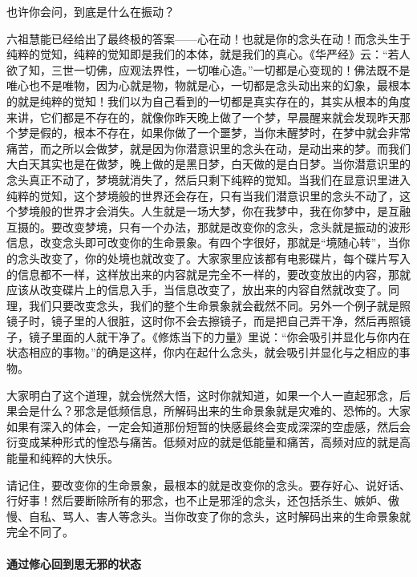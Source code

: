 也许你会问，到底是什么在振动？

六祖慧能已经给出了最终极的答案——心在动！也就是你的念头在动！而念头生于纯粹的觉知，纯粹的觉知即是我们的本体，就是我们的真心。《华严经》云：“若人欲了知，三世一切佛，应观法界性，一切唯心造。”一切都是心变现的！佛法既不是唯心也不是唯物，因为心就是物，物就是心，一切都是念头动出来的幻象，最根本的就是纯粹的觉知！我们以为自己看到的一切都是真实存在的，其实从根本的角度来讲，它们都是不存在的，就像你昨天晚上做了一个梦，早晨醒来就会发现昨天那个梦是假的，根本不存在，如果你做了一个噩梦，当你未醒梦时，在梦中就会非常痛苦，而之所以会做梦，就是因为你潜意识里的念头在动，是动出来的梦。而我们大白天其实也是在做梦，晚上做的是黑日梦，白天做的是白日梦。当你潜意识里的念头真正不动了，梦境就消失了，然后只剩下纯粹的觉知。当我们在显意识里进入纯粹的觉知，这个梦境般的世界还会存在，只有当我们潜意识里的念头不动了，这个梦境般的世界才会消失。人生就是一场大梦，你在我梦中，我在你梦中，是互融互摄的。要改变梦境，只有一个办法，那就是改变你的念头，念头就是振动的波形信息，改变念头即可改变你的生命景象。有四个字很好，那就是“境随心转”，当你的念头改变了，你的处境也就改变了。大家家里应该都有电影碟片，每个碟片写入的信息都不一样，这样放出来的内容就是完全不一样的，要改变放出的内容，那就应该从改变碟片上的信息入手，当信息改变了，放出来的内容自然就改变了。同理，我们只要改变念头，我们的整个生命景象就会截然不同。另外一个例子就是照镜子时，镜子里的人很脏，这时你不会去擦镜子，而是把自己弄干净，然后再照镜子，镜子里面的人就干净了。《修炼当下的力量》里说：“你会吸引并显化与你内在状态相应的事物。”的确是这样，你内在起什么念头，就会吸引并显化与之相应的事物。

大家明白了这个道理，就会恍然大悟，这时你就知道，如果一个人一直起邪念，后果会是什么？邪念是低频信息，所解码出来的生命景象就是灾难的、恐怖的。大家如果有深入的体会，一定会知道那份短暂的快感最终会变成深深的空虚感，然后会衍变成某种形式的惶恐与痛苦。低频对应的就是低能量和痛苦，高频对应的就是高能量和纯粹的大快乐。

请记住，要改变你的生命景象，最根本的就是改变你的念头。要存好心、说好话、行好事！然后要断除所有的邪念，也不止是邪淫的念头，还包括杀生、嫉妒、傲慢、自私、骂人、害人等念头。当你改变了你的念头，这时解码出来的生命景象就完全不同了。

\paragraph{通过修心回到思无邪的状态}


